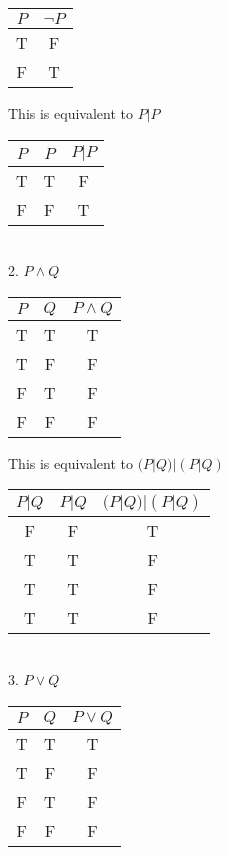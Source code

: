\documentclass[hidelinks]{article}
\begin{document}
\vspace{0.2cm}
\begin{tabular}{|c|c|}
\hline 
$P$ & $\neg P$ \\
\hline
T & F \\
F & T \\
\hline
\end{tabular}

\vspace{0.2cm}
This is equivalent to $P|P$

\vspace{0.2cm}
\begin{tabular}{|c|c|c|}
\hline 
$P$ & $P$ & $P|P$ \\
\hline
T & T & F \\
F & F & T \\
\hline
\end{tabular}\vspace{0.5cm}\\
2. $P \wedge Q$

\vspace{0.2cm}
\begin{tabular}{|c|c|c|}
\hline 
$P$ & $Q$ & $P \wedge Q$ \\
\hline
T & T & T \\
T & F & F \\
F & T & F \\
F & F & F \\
\hline
\end{tabular}

\vspace{0.2cm}
This is equivalent to $(P|Q)|(P|Q)$

\vspace{0.2cm}
\begin{tabular}{|c|c|c|}
\hline 
$P|Q$ & $P|Q$ & $(P|Q)|(P|Q)$\\
\hline
F & F & T \\
T & T & F \\
T & T & F \\
T & T & F \\
\hline
\end{tabular} \vspace{0.5cm}\\
3. $P \vee Q$

\vspace{0.2cm}
\begin{tabular}{|c|c|c|}
\hline 
$P$ & $Q$ & $P \vee Q$ \\
\hline
T & T & T \\
T & F & F \\
F & T & F \\
F & F & F \\
\hline
\end{tabular}
\end{document}
